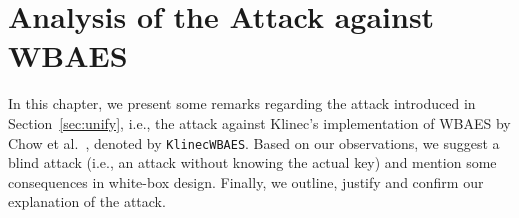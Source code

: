 \chapter{Analysis of the Attack against WBAES}
\label{chap:analysis}

In this chapter, we present some remarks regarding the attack introduced in Section~\ref{sec:unify}, i.e., the attack against Klinec's implementation \cite{klinec2013implementation} of WBAES by Chow et al.\ \cite{chow2002aes}, denoted by {\tt KlinecWBAES}. Based on our observations, we suggest a blind attack (i.e., an attack without knowing the actual key) and mention some consequences in white-box design. Finally, we outline, justify and confirm our explanation of the attack.









